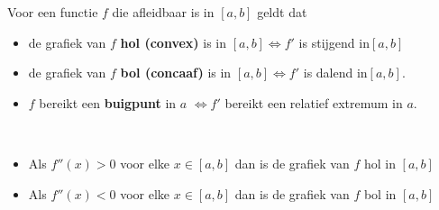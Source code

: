 \documentclass{ximera}
\begin{document}

\begin{definition}
  Voor een functie $f$ die afleidbaar is in $[a,b]$ geldt dat
  \begin{itemize}
      \item de grafiek van $f$ \textbf{hol (convex)} is in $[a,b] \Leftrightarrow f'$ is stijgend in$[a,b]$
      \item de grafiek van $f$ \textbf{bol (concaaf)} is in $[a,b] \Leftrightarrow f'$ is dalend in$[a,b]$.
      \item $f$ bereikt een \textbf{buigpunt} in $a$ $\Leftrightarrow f'$ bereikt een relatief extremum in $a$. 
  \end{itemize}
  \end{definition}

  \begin{theorem} \ \\
      \begin{itemize}
          \item Als $f''(x)>0$ voor elke $x\in [a,b]$ dan is de grafiek van $f$ hol in $[a,b]$
          \item Als $f''(x)<0$ voor elke $x\in [a,b]$ dan is de grafiek van $f$ bol in $[a,b]$
      \end{itemize}
  \end{theorem}
\end{document}
